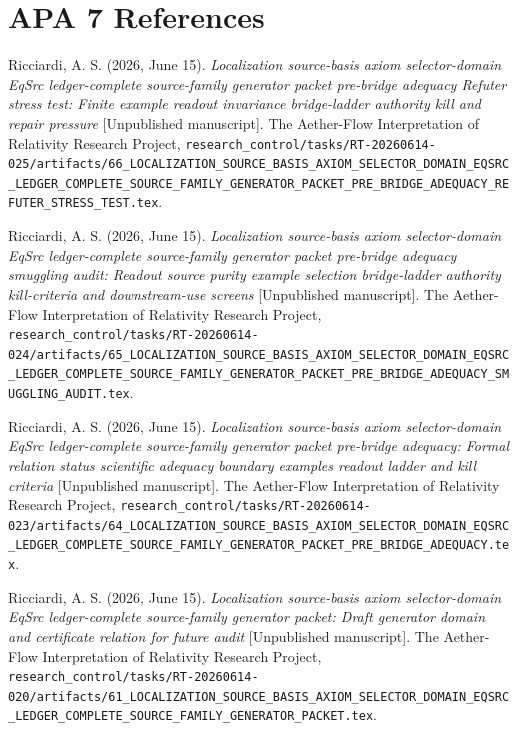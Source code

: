 \documentclass[11pt]{article}
\begin{document}
\section*{APA 7 References}

Ricciardi, A. S. (2026, June 15). \emph{Localization source-basis axiom
selector-domain EqSrc ledger-complete source-family generator packet
pre-bridge adequacy Refuter stress test: Finite example readout
invariance bridge-ladder authority kill and repair pressure}
[Unpublished manuscript]. The Aether-Flow Interpretation of Relativity
Research Project,
\texttt{research\_control/tasks/RT-20260614-025/artifacts/66\_LOCALIZATION\_SOURCE\_BASIS\_AXIOM\_SELECTOR\_DOMAIN\_EQSRC\_LEDGER\_COMPLETE\_SOURCE\_FAMILY\_GENERATOR\_PACKET\_PRE\_BRIDGE\_ADEQUACY\_REFUTER\_STRESS\_TEST.tex}.

Ricciardi, A. S. (2026, June 15). \emph{Localization source-basis axiom
selector-domain EqSrc ledger-complete source-family generator packet
pre-bridge adequacy smuggling audit: Readout source purity example
selection bridge-ladder authority kill-criteria and downstream-use
screens} [Unpublished manuscript]. The Aether-Flow Interpretation of
Relativity Research Project,
\texttt{research\_control/tasks/RT-20260614-024/artifacts/65\_LOCALIZATION\_SOURCE\_BASIS\_AXIOM\_SELECTOR\_DOMAIN\_EQSRC\_LEDGER\_COMPLETE\_SOURCE\_FAMILY\_GENERATOR\_PACKET\_PRE\_BRIDGE\_ADEQUACY\_SMUGGLING\_AUDIT.tex}.

Ricciardi, A. S. (2026, June 15). \emph{Localization source-basis axiom
selector-domain EqSrc ledger-complete source-family generator packet
pre-bridge adequacy: Formal relation status scientific adequacy
boundary examples readout ladder and kill criteria} [Unpublished
manuscript]. The Aether-Flow Interpretation of Relativity Research
Project,
\texttt{research\_control/tasks/RT-20260614-023/artifacts/64\_LOCALIZATION\_SOURCE\_BASIS\_AXIOM\_SELECTOR\_DOMAIN\_EQSRC\_LEDGER\_COMPLETE\_SOURCE\_FAMILY\_GENERATOR\_PACKET\_PRE\_BRIDGE\_ADEQUACY.tex}.

Ricciardi, A. S. (2026, June 15). \emph{Localization source-basis axiom
selector-domain EqSrc ledger-complete source-family generator packet:
Draft generator domain and certificate relation for future audit}
[Unpublished manuscript]. The Aether-Flow Interpretation of Relativity
Research Project,
\texttt{research\_control/tasks/RT-20260614-020/artifacts/61\_LOCALIZATION\_SOURCE\_BASIS\_AXIOM\_SELECTOR\_DOMAIN\_EQSRC\_LEDGER\_COMPLETE\_SOURCE\_FAMILY\_GENERATOR\_PACKET.tex}.
\end{document}
